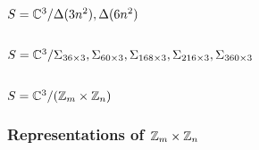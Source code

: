     \subsection{$S=\mathbb{C}^3/\Delta(3n^2),\Delta(6n^2)$}

    \subsection{$S=\mathbb{C}^3/\Sigma_{36\times 3},\Sigma_{60\times 3},\Sigma_{168\times 3},\Sigma_{216\times 3},\Sigma_{360\times 3}$}


    \subsection{$S=\mathbb{C}^3/(\mathbb{Z}_m\times\mathbb{Z}_n)$}

        \subsubsection{Representations of $\mathbb{Z}_m\times\mathbb{Z}_n$}

